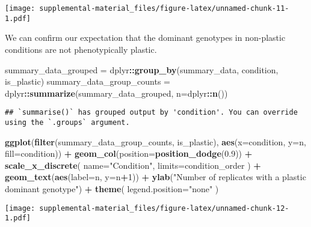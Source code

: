 \documentclass[]{book}
\newenvironment{Shaded}{\begin{snugshade}}{\end{snugshade}}
\newcommand{\DataTypeTok}[1]{\textcolor[rgb]{0.13,0.29,0.53}{#1}}
\newcommand{\DecValTok}[1]{\textcolor[rgb]{0.00,0.00,0.81}{#1}}
\newcommand{\FloatTok}[1]{\textcolor[rgb]{0.00,0.00,0.81}{#1}}
\newcommand{\KeywordTok}[1]{\textcolor[rgb]{0.13,0.29,0.53}{\textbf{#1}}}
\newcommand{\NormalTok}[1]{#1}
\newcommand{\OperatorTok}[1]{\textcolor[rgb]{0.81,0.36,0.00}{\textbf{#1}}}
\newcommand{\StringTok}[1]{\textcolor[rgb]{0.31,0.60,0.02}{#1}}
\begin{document}
\texttt{[image: supplemental-material\_files/figure-latex/unnamed-chunk-11-1.pdf]}

We can confirm our expectation that the dominant genotypes in non-plastic conditions are not phenotypically plastic.

\begin{Shaded}
\begin{Highlighting}[]
\NormalTok{summary_data_grouped =}\StringTok{ }\NormalTok{dplyr}\OperatorTok{::}\KeywordTok{group_by}\NormalTok{(summary_data, condition, is_plastic)}
\NormalTok{summary_data_group_counts =}\StringTok{ }\NormalTok{dplyr}\OperatorTok{::}\KeywordTok{summarize}\NormalTok{(summary_data_grouped, }\DataTypeTok{n=}\NormalTok{dplyr}\OperatorTok{::}\KeywordTok{n}\NormalTok{())}
\end{Highlighting}
\end{Shaded}

\begin{verbatim}
## `summarise()` has grouped output by 'condition'. You can override using the `.groups` argument.
\end{verbatim}

\begin{Shaded}
\begin{Highlighting}[]
\KeywordTok{ggplot}\NormalTok{(}\KeywordTok{filter}\NormalTok{(summary_data_group_counts, is_plastic), }\KeywordTok{aes}\NormalTok{(}\DataTypeTok{x=}\NormalTok{condition, }\DataTypeTok{y=}\NormalTok{n, }\DataTypeTok{fill=}\NormalTok{condition)) }\OperatorTok{+}
\StringTok{  }\KeywordTok{geom_col}\NormalTok{(}\DataTypeTok{position=}\KeywordTok{position_dodge}\NormalTok{(}\FloatTok{0.9}\NormalTok{)) }\OperatorTok{+}
\StringTok{  }\KeywordTok{scale_x_discrete}\NormalTok{(}
    \DataTypeTok{name=}\StringTok{"Condition"}\NormalTok{,}
    \DataTypeTok{limits=}\NormalTok{condition_order}
\NormalTok{  ) }\OperatorTok{+}
\StringTok{  }\KeywordTok{geom_text}\NormalTok{(}\KeywordTok{aes}\NormalTok{(}\DataTypeTok{label=}\NormalTok{n, }\DataTypeTok{y=}\NormalTok{n}\OperatorTok{+}\DecValTok{1}\NormalTok{)) }\OperatorTok{+}
\StringTok{  }\KeywordTok{ylab}\NormalTok{(}\StringTok{"Number of replicates with a plastic dominant genotype"}\NormalTok{) }\OperatorTok{+}
\StringTok{  }\KeywordTok{theme}\NormalTok{(}
    \DataTypeTok{legend.position=}\StringTok{"none"}
\NormalTok{  )}
\end{Highlighting}
\end{Shaded}

\texttt{[image: supplemental-material\_files/figure-latex/unnamed-chunk-12-1.pdf]}
\end{document}
